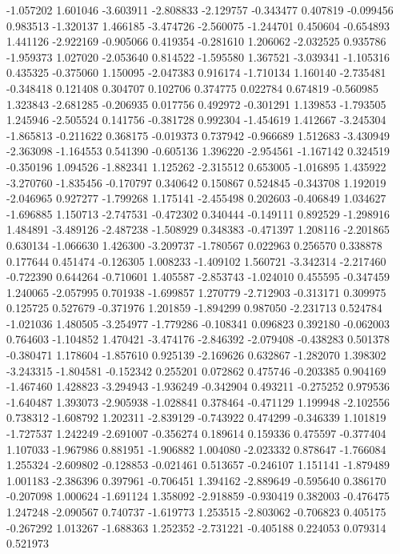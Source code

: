 -1.057202
1.601046
-3.603911
-2.808833
-2.129757
-0.343477
0.407819
-0.099456
0.983513
-1.320137
1.466185
-3.474726
-2.560075
-1.244701
0.450604
-0.654893
1.441126
-2.922169
-0.905066
0.419354
-0.281610
1.206062
-2.032525
0.935786
-1.959373
1.027020
-2.053640
0.814522
-1.595580
1.367521
-3.039341
-1.105316
0.435325
-0.375060
1.150095
-2.047383
0.916174
-1.710134
1.160140
-2.735481
-0.348418
0.121408
0.304707
0.102706
0.374775
0.022784
0.674819
-0.560985
1.323843
-2.681285
-0.206935
0.017756
0.492972
-0.301291
1.139853
-1.793505
1.245946
-2.505524
0.141756
-0.381728
0.992304
-1.454619
1.412667
-3.245304
-1.865813
-0.211622
0.368175
-0.019373
0.737942
-0.966689
1.512683
-3.430949
-2.363098
-1.164553
0.541390
-0.605136
1.396220
-2.954561
-1.167142
0.324519
-0.350196
1.094526
-1.882341
1.125262
-2.315512
0.653005
-1.016895
1.435922
-3.270760
-1.835456
-0.170797
0.340642
0.150867
0.524845
-0.343708
1.192019
-2.046965
0.927277
-1.799268
1.175141
-2.455498
0.202603
-0.406849
1.034627
-1.696885
1.150713
-2.747531
-0.472302
0.340444
-0.149111
0.892529
-1.298916
1.484891
-3.489126
-2.487238
-1.508929
0.348383
-0.471397
1.208116
-2.201865
0.630134
-1.066630
1.426300
-3.209737
-1.780567
0.022963
0.256570
0.338878
0.177644
0.451474
-0.126305
1.008233
-1.409102
1.560721
-3.342314
-2.217460
-0.722390
0.644264
-0.710601
1.405587
-2.853743
-1.024010
0.455595
-0.347459
1.240065
-2.057995
0.701938
-1.699857
1.270779
-2.712903
-0.313171
0.309975
0.125725
0.527679
-0.371976
1.201859
-1.894299
0.987050
-2.231713
0.524784
-1.021036
1.480505
-3.254977
-1.779286
-0.108341
0.096823
0.392180
-0.062003
0.764603
-1.104852
1.470421
-3.474176
-2.846392
-2.079408
-0.438283
0.501378
-0.380471
1.178604
-1.857610
0.925139
-2.169626
0.632867
-1.282070
1.398302
-3.243315
-1.804581
-0.152342
0.255201
0.072862
0.475746
-0.203385
0.904169
-1.467460
1.428823
-3.294943
-1.936249
-0.342904
0.493211
-0.275252
0.979536
-1.640487
1.393073
-2.905938
-1.028841
0.378464
-0.471129
1.199948
-2.102556
0.738312
-1.608792
1.202311
-2.839129
-0.743922
0.474299
-0.346339
1.101819
-1.727537
1.242249
-2.691007
-0.356274
0.189614
0.159336
0.475597
-0.377404
1.107033
-1.967986
0.881951
-1.906882
1.004080
-2.023332
0.878647
-1.766084
1.255324
-2.609802
-0.128853
-0.021461
0.513657
-0.246107
1.151141
-1.879489
1.001183
-2.386396
0.397961
-0.706451
1.394162
-2.889649
-0.595640
0.386170
-0.207098
1.000624
-1.691124
1.358092
-2.918859
-0.930419
0.382003
-0.476475
1.247248
-2.090567
0.740737
-1.619773
1.253515
-2.803062
-0.706823
0.405175
-0.267292
1.013267
-1.688363
1.252352
-2.731221
-0.405188
0.224053
0.079314
0.521973
